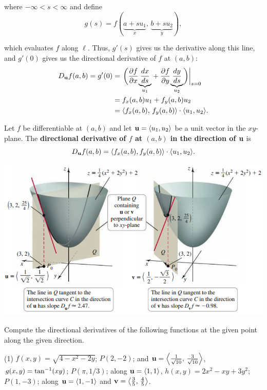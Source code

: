 \documentclass[mathNotesPreamble]{subfiles}
\begin{document}
  where $-\infty<s<\infty$ and define
    \[g(s)=f(\underbrace{a+su_1}_x,\,\underbrace{b+su_2}_y),\]

  which evaluates $f$ along $\ell$. Thus, $g'(s)$ gives us the derivative along this line, and $g'(0)$ gives us the directional derivative of $f$ at $(a,b)$:
  \begin{align*}
    D_{\mathbf{u}} f(a,b)=g'(0)&=\left.{\left(\frac{\partial f}{\partial x}\smash{\underbrace{\frac{dx}{ds}}_{u_1}}+\frac{\partial f}{\partial y}\smash{\underbrace{\frac{dy}{ds}}_{u_2}}\right)}\right|_{s=0}\\[0.75\baselineskip]
      &=f_x(a,b) u_1+f_y(a,b)u_2\\
      &={\left\langle f_x(a,b),\,f_y(a,b) \right\rangle}\cdot{\left\langle u_1,u_2 \right\rangle}.
  \end{align*}

  \begin{thmBox*}
    Let $f$ be differentiable at $(a,b)$ and let ${\mathbf{u}}={\left\langle u_1,u_2 \right\rangle}$ be a unit vector in the $xy$-plane. The \textbf{directional derivative of $f$ at $(a,b)$ in the direction of ${\mathbf{u}}$} is
      \[D_{\mathbf{u}} f(a,b)={\left\langle f_x(a,b), f_y(a,b) \right\rangle}\cdot{\left\langle u_1, u_2 \right\rangle}.\]
  \end{thmBox*}

  \begin{center}
    \includegraphics[width=0.55\linewidth]{images/briggs_15_05/fig15_48}
  \end{center}
  \pagebreak

  \begin{ex*}
    Compute the directional derivatives of the following functions at the given point along the given direction.
  \end{ex*}
  \begin{tasks}[after-item-skip=\stretch{1}, label=](1)
    \task $f(x,y)=\sqrt{4-x^2-2y}$; $P(2,-2)$; and ${\mathbf{u}}={\left\langle \frac{1}{\sqrt{10}},\,\frac{3}{\sqrt{10}} \right\rangle}$,
    \task $g(x,y)=\tan^{-1}(xy)$; $P(\pi,1/3)$; along ${\mathbf{u}}={\left\langle 1,1 \right\rangle}$,
    \task $h(x,y)=2x^2-xy+3y^2$; $P(1,-3)$; along ${\mathbf{u}}={\left\langle 1,-1 \right\rangle}$ and ${\mathbf{v}}={\left\langle \frac{3}{5},\,\frac{4}{5} \right\rangle}$.
  \end{tasks}
  \pagebreak
\end{document}
